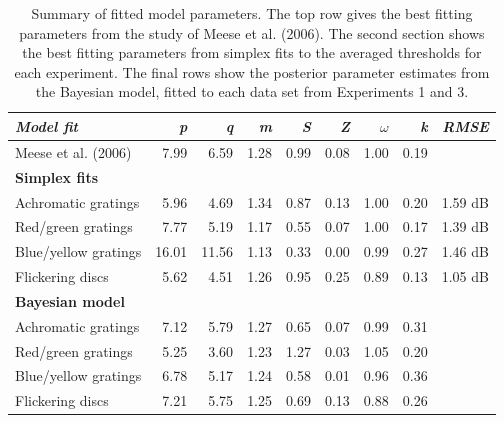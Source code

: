 \documentclass[
  letterpaper,
  DIV=11,
  numbers=noendperiod]{scrartcl}
\begin{document}
\hypertarget{tbl-parametertable}{}
\begin{table}
\caption{\label{tbl-parametertable}Summary of fitted model parameters. The top row gives the best fitting
parameters from the study of Meese et al. (2006). The second section
shows the best fitting parameters from simplex fits to the averaged
thresholds for each experiment. The final rows show the posterior
parameter estimates from the Bayesian model, fitted to each data set
from Experiments 1 and 3. }\tabularnewline

\centering
\begin{tabular}{lrrrrrrrr}
\toprule
\textbf{\em{Model fit}} & \textbf{\em{p}} & \textbf{\em{q}} & \textbf{\em{m}} & \textbf{\em{S}} & \textbf{\em{Z}} & \textbf{\em{$\omega$}} & \textbf{\em{k}} & \textbf{\em{RMSE}}\\
\midrule
Meese et al. (2006) & 7.99 & 6.59 & 1.28 & 0.99 & 0.08 & 1.00 & 0.19 & \\
\midrule
\textbf{Simplex fits} & \textbf{} & \textbf{} & \textbf{} & \textbf{} & \textbf{} & \textbf{} & \textbf{} & \textbf{}\\
Achromatic gratings & 5.96 & 4.69 & 1.34 & 0.87 & 0.13 & 1.00 & 0.20 & 1.59 dB\\
Red/green gratings & 7.77 & 5.19 & 1.17 & 0.55 & 0.07 & 1.00 & 0.17 & 1.39 dB\\
Blue/yellow gratings & 16.01 & 11.56 & 1.13 & 0.33 & 0.00 & 0.99 & 0.27 & 1.46 dB\\
Flickering discs & 5.62 & 4.51 & 1.26 & 0.95 & 0.25 & 0.89 & 0.13 & 1.05 dB\\
\midrule
\textbf{Bayesian model} & \textbf{} & \textbf{} & \textbf{} & \textbf{} & \textbf{} & \textbf{} & \textbf{} & \textbf{}\\
Achromatic gratings & 7.12 & 5.79 & 1.27 & 0.65 & 0.07 & 0.99 & 0.31 & \\
Red/green gratings & 5.25 & 3.60 & 1.23 & 1.27 & 0.03 & 1.05 & 0.20 & \\
Blue/yellow gratings & 6.78 & 5.17 & 1.24 & 0.58 & 0.01 & 0.96 & 0.36 & \\
Flickering discs & 7.21 & 5.75 & 1.25 & 0.69 & 0.13 & 0.88 & 0.26 & \\
\bottomrule
\end{tabular}
\end{table}
\end{document}
